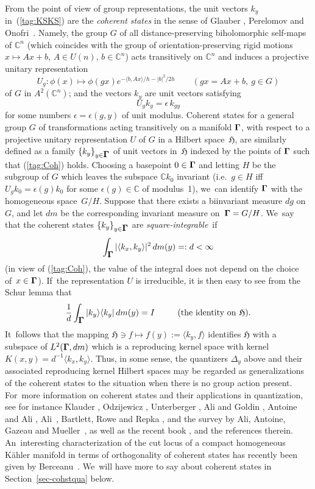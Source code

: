 \documentclass[12pt]{amsart}
\numberwithin{equation}{section}
\theoremstyle{remark}
\newcommand\spr[2]{\langle #1,#2\rangle}
\newcommand\into{\int_\Omg}
\newcommand\Omg{{\bigam}}   %
\newcommand\HH{\mathfrak H}
\newcommand{\CC}{\C}
\newcommand{\bigam}{\mbox{\boldmath $\Gamma$}}
\newcommand{\C}{\mathbb C}
\begin{document}
From the point of view of group representations, the unit vectors $k_y$
in~(\ref{tag:KSKS}) are the {\it coherent states\/} in the sense of Glauber
\cite{bib:Glaub}, Perelomov \cite{bib:Perel} and Onofri~\cite{bib:Onof}.
Namely, the group $G$ of all distance-preserving biholomorphic self-maps of
$\CC^n$ (which coincides with the group of orientation-preserving rigid motions
$x\mapsto Ax+b$, $A\in U(n)$, $b\in\CC^n$) acts transitively on $\CC^n$ and
induces a projective unitary representation
$$ U_g: \phi(x) \mapsto \phi(gx) e^{-\spr b{Ax}/h-|b|^2/2h}
\qquad (gx=Ax+b, \  g\in G)  $$
of $G$ in $A^2(\CC^n)$; and the vectors $k_y$ are unit vectors satisfying
\begin{equation}  U_g k_y = \epsilon \, k_{gy}  \label{tag:Coh}  \end{equation}
for some numbers $\epsilon=\epsilon(g,y)$ of unit modulus. Coherent states for
a general group $G$ of transformations acting transitively on a manifold
$\Omg$, with respect to a projective unitary representation $U$ of $G$ in a
Hilbert space~$\HH$, are similarly defined as a family $\{k_y\}_{y\in \Omg}$ of
unit vectors in~$\HH$ indexed by the points of $\Omg$ such that (\ref{tag:Coh})
holds. Choosing a basepoint $0\in \Omg$ and letting $H$ be the subgroup of $G$
which leaves the subspace $\CC k_0$ invariant (i.e.~$g\in H$ iff $U_g
k_0=\epsilon(g) k_0$ for some $\epsilon(g)\in\CC$ of modulus~1), we~can
identify $\Omg$ with the homogeneous space~$G/H$. Suppose that there exists a
biinvariant measure $dg$ on~$G$, and let $dm$ be the corresponding invariant
measure on~$\Omg=G/H$. We~say that the coherent states $\{k_y\}_{y\in \Omg}$
are {\it square-integrable\/}~if
$$ \into |\spr{k_x}{k_y}|^2 \, dm(y) =:d<\infty   $$
(in view of (\ref{tag:Coh}), the value of the integral does not depend on the
choice of~$x\in \Omg$). If~the representation $U$ is irreducible, it is then
easy to see from the Schur lemma that
$$ \frac1d \into \vert k_y \rangle\langle k_y\vert \, dm(y) = I
\qquad\text{(the identity on $\HH$).}  $$
It~follows that the mapping $\HH\ni f\mapsto f(y):= \spr {k_y}f$ identifies
$\HH$ with a subspace of $L^2(\Omg,dm)$ which is a reproducing kernel space
with kernel $K(x,y)= d^{-1} \spr{k_x}{k_y}$. Thus, in some sense, the
quantizers $\Delta_y$ above and their associated reproducing kernel Hilbert
spaces may be regarded as generalizations of the coherent states to the
situation when there is no group action present. For~more information on
coherent states and their applications in quantization, see for instance
Klauder \cite{bib:Klaud}, Odzijewicz \cite{bib:OdziB}, Unterberger
\cite{bib:UntCS}, Ali and Goldin \cite{bib:AliGo}, Antoine and Ali
\cite{bib:AAli}, Ali~\cite{bib:AliCS}, Bartlett, Rowe and Repka
\cite{bib:+Rowe}, and the survey by Ali, Antoine, Gazeau and
Mueller~\cite{bib:AAGM}, as well as the recent book \cite{bib:AAGbk}, and the
references therein. An~interesting characterization of the cut locus of a
compact homogeneous K\"ahler manifold in terms of orthogonality of coherent
states has recently been given by Berceanu~\cite{bib:Berc}. We~will have more
to say about coherent states in Section~\ref{sec-cohstqua} below.
\end{document}
